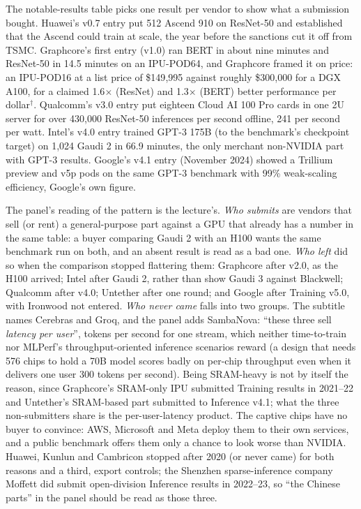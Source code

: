 \documentclass[11pt,letterpaper]{article}
\begin{document}
The notable-results table picks one result per vendor to show what a submission bought. Huawei's v0.7 entry put 512 Ascend 910 on ResNet-50 and established that the Ascend could train at scale, the year before the sanctions cut it off from TSMC. Graphcore's first entry (v1.0) ran BERT in about nine minutes and ResNet-50 in 14.5 minutes on an IPU-POD64, and Graphcore framed it on price: an IPU-POD16 at a list price of \$149{,}995 against roughly \$300{,}000 for a DGX A100, for a claimed 1.6$\times$ (ResNet) and 1.3$\times$ (BERT) better performance per dollar$^\dagger$. Qualcomm's v3.0 entry put eighteen Cloud AI 100 Pro cards in one 2U server for over 430{,}000 ResNet-50 inferences per second offline, 241 per second per watt. Intel's v4.0 entry trained GPT-3 175B (to the benchmark's checkpoint target) on 1{,}024 Gaudi 2 in 66.9 minutes, the only merchant non-NVIDIA part with GPT-3 results. Google's v4.1 entry (November 2024) showed a Trillium preview and v5p pods on the same GPT-3 benchmark with 99\% weak-scaling efficiency, Google's own figure.

The panel's reading of the pattern is the lecture's. \emph{Who submits} are vendors that sell (or rent) a general-purpose part against a GPU that already has a number in the same table: a buyer comparing Gaudi 2 with an H100 wants the same benchmark run on both, and an absent result is read as a bad one. \emph{Who left} did so when the comparison stopped flattering them: Graphcore after v2.0, as the H100 arrived; Intel after Gaudi 2, rather than show Gaudi 3 against Blackwell; Qualcomm after v4.0; Untether after one round; and Google after Training v5.0, with Ironwood not entered. \emph{Who never came} falls into two groups. The subtitle names Cerebras and Groq, and the panel adds SambaNova: ``these three sell \emph{latency per user}'', tokens per second for one stream, which neither time-to-train nor MLPerf's throughput-oriented inference scenarios reward (a design that needs 576 chips to hold a 70B model scores badly on per-chip throughput even when it delivers one user 300 tokens per second). Being SRAM-heavy is not by itself the reason, since Graphcore's SRAM-only IPU submitted Training results in 2021--22 and Untether's SRAM-based part submitted to Inference v4.1; what the three non-submitters share is the per-user-latency product. The captive chips have no buyer to convince: AWS, Microsoft and Meta deploy them to their own services, and a public benchmark offers them only a chance to look worse than NVIDIA. Huawei, Kunlun and Cambricon stopped after 2020 (or never came) for both reasons and a third, export controls; the Shenzhen sparse-inference company Moffett did submit open-division Inference results in 2022--23, so ``the Chinese parts'' in the panel should be read as those three.
\end{document}
